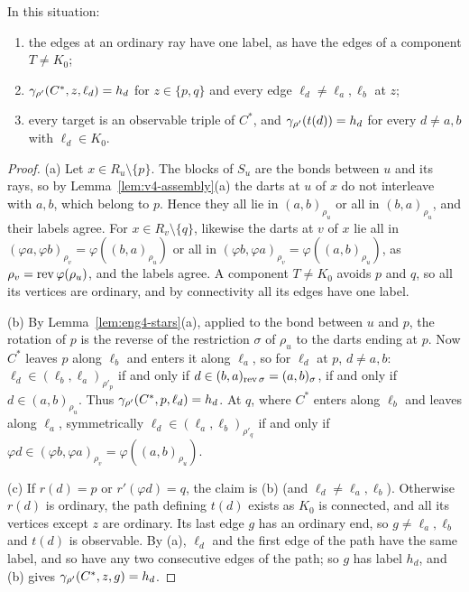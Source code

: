 \begin{lemma}\label{lem:eng4-labels}
In this situation:
\begin{enumerate}[label=(\alph*),nosep]
\item the edges at an ordinary ray have one label, as have the edges of a
  component $T\ne K_0$;
\item $\gamma_{\rho'}(C^\ast,z,\ell_d)=h_d$ for $z\in\{p,q\}$ and every edge
  $\ell_d\ne\ell_a,\ell_b$ at $z$;
\item every target is an observable triple of $C^\ast$, and
  $\gamma_{\rho'}(t(d))=h_d$ for every $d\ne a,b$ with $\ell_d\in K_0$.
\end{enumerate}
\end{lemma}

\begin{proof}
(a) Let $x\in R_u\setminus\{p\}$. The blocks of $S_u$ are the bonds between
$u$ and its rays, so by Lemma~\ref{lem:v4-assembly}(a) the darts at $u$ of
$x$ do not interleave with $a,b$, which belong to $p$. Hence they all lie in
$(a,b)_{\rho_u}$ or all in $(b,a)_{\rho_u}$, and their labels agree. For
$x\in R_v\setminus\{q\}$, likewise the darts at $v$ of $x$ lie all in
$(\varphi a,\varphi b)_{\rho_v}=\varphi((b,a)_{\rho_u})$ or all in
$(\varphi b,\varphi a)_{\rho_v}=\varphi((a,b)_{\rho_u})$, as
$\rho_v=\operatorname{rev}\varphi(\rho_u)$, and the labels agree. A component $T\ne K_0$ avoids
$p$ and $q$, so all its vertices are ordinary, and by connectivity all its
edges have one label.

(b) By Lemma~\ref{lem:eng4-stars}(a), applied to the bond between $u$ and
$p$, the rotation of $p$ is the reverse of the restriction $\sigma$ of
$\rho_u$ to the darts ending at $p$. Now $C^\ast$ leaves $p$ along $\ell_b$
and enters it along $\ell_a$, so for $\ell_d$ at $p$, $d\ne a,b$:
$\ell_d\in(\ell_b,\ell_a)_{\rho'_p}$ if and only if
$d\in(b,a)_{\operatorname{rev}\sigma}=(a,b)_\sigma$, if and only if $d\in(a,b)_{\rho_u}$.
Thus $\gamma_{\rho'}(C^\ast,p,\ell_d)=h_d$. At $q$, where $C^\ast$ enters along
$\ell_b$ and leaves along $\ell_a$, symmetrically
$\ell_d\in(\ell_a,\ell_b)_{\rho'_q}$ if and only if $\varphi
d\in(\varphi b,\varphi a)_{\rho_v}=\varphi((a,b)_{\rho_u})$.

(c) If $r(d)=p$ or $r'(\varphi d)=q$, the claim is (b) (and $\ell_d\ne
\ell_a,\ell_b$). Otherwise $r(d)$ is ordinary, the path defining $t(d)$
exists as $K_0$ is connected, and all its vertices except $z$ are ordinary.
Its last edge $g$ has an ordinary end, so $g\ne\ell_a,\ell_b$ and $t(d)$ is
observable. By (a), $\ell_d$ and the first edge of the path have the same
label, and so have any two consecutive edges of the path; so $g$ has label
$h_d$, and (b) gives $\gamma_{\rho'}(C^\ast,z,g)=h_d$.
\end{proof}

